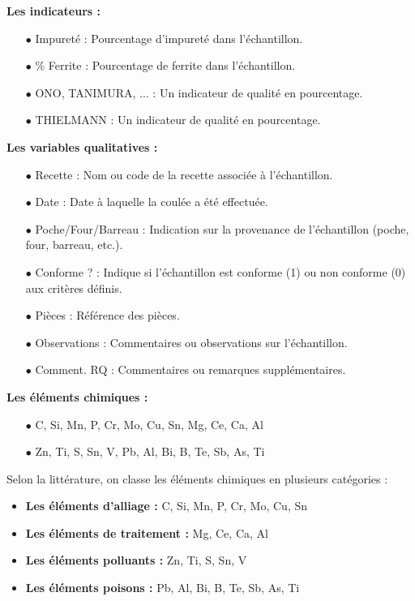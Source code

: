 \documentclass[12pt]{article}
\begin{document}
\vspace{0.5cm}

\textbf{Les indicateurs :}

\begin{itemize}
\item[$\bullet$] Impureté : Pourcentage d'impureté dans l'échantillon.
\item[$\bullet$] \% Ferrite : Pourcentage de ferrite dans l'échantillon.
\item[$\bullet$] ONO, TANIMURA, ... : Un indicateur de qualité en pourcentage.
\item[$\bullet$] THIELMANN : Un indicateur de qualité en pourcentage.
\end{itemize}
 
\vspace{0.5cm}

\textbf{Les variables qualitatives :}

\begin{itemize}
\item[$\bullet$] Recette : Nom ou code de la recette associée à l'échantillon.
\item[$\bullet$] Date : Date à laquelle la coulée a été effectuée.
\item[$\bullet$] Poche/Four/Barreau : Indication sur la provenance de l'échantillon (poche, four, barreau, etc.).
\item[$\bullet$] Conforme ? : Indique si l'échantillon est conforme (1) ou non conforme (0) aux critères définis.
\item[$\bullet$] Pièces : Référence des pièces.
\item[$\bullet$] Observations : Commentaires ou observations sur l'échantillon.
\item[$\bullet$] Comment. RQ : Commentaires ou remarques supplémentaires.
\end{itemize}

\vspace{0.5cm}

\textbf{Les éléments chimiques :}

\begin{itemize}
\item[$\bullet$] C, Si, Mn, P, Cr, Mo, Cu, Sn, Mg, Ce, Ca, Al 
\item[$\bullet$] Zn, Ti, S, Sn, V, Pb, Al, Bi, B, Te, Sb, As, Ti 
\end{itemize}


Selon la littérature, on classe les éléments chimiques en plusieurs catégories :
\begin{itemize}
    \item \textbf{Les éléments d'alliage :}  C, Si, Mn, P, Cr, Mo, Cu, Sn 
    \item \textbf{Les éléments de traitement :} Mg, Ce, Ca, Al
    \item \textbf{Les éléments polluants :}  Zn, Ti, S, Sn, V 
    \item \textbf{Les éléments poisons :}  Pb, Al, Bi, B, Te, Sb, As, Ti
\end{itemize}
\end{document}

